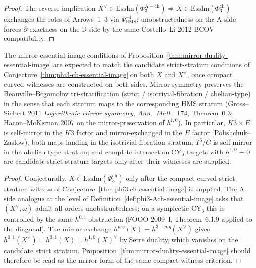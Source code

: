 \begin{proof}
The reverse implication $X^\vee \in \mathrm{EssIm}(\Phi_3^{\mathrm{A-ch}}) \Rightarrow X \in \mathrm{EssIm}(\Phi_3^{\mathrm{ch}})$ exchanges the roles of Arrows~1--3 via $\Psi_{\mathrm{HMS}}^{-1}$: unobstructedness on the A-side forces $\bar\partial$-exactness on the B-side by the same Costello--Li 2012 BCOV compatibility.
\end{proof}

\begin{corollary}
\label{cor:mirror-essential-image-strict}
The mirror essential-image conditions of Proposition~\ref{thm:mirror-duality-essential-image} are expected to match the candidate strict-stratum conditions of Conjecture~\ref{thm:phi3-ch-essential-image} on both $X$ and $X^\vee$, once compact curved witnesses are constructed on both sides. Mirror symmetry preserves the Beauville--Bogomolov tri-stratification (strict / isotrivial-fibration / abelian-type) in the sense that each stratum maps to the corresponding HMS stratum (Gross--Siebert 2011 \textit{Logarithmic mirror symmetry}, \textit{Ann.~Math.}~174, Theorem~0.3; Hacon--McKernan 2007 on the mirror-preservation of $h^{1,0}$). In particular, $K3 \times E$ is self-mirror in the $K3$ factor and mirror-exchanged in the $E$ factor (Polishchuk--Zaslow), both maps landing in the isotrivial-fibration stratum; $T^6/G$ is self-mirror in the abelian-type stratum; and complete-intersection CY$_3$ targets with $h^{1,0} = 0$ are candidate strict-stratum targets only after their witnesses are supplied.
\end{corollary}

\begin{proof}
Conjecturally, $X \in \mathrm{EssIm}(\Phi_3^{\mathrm{ch}})$ only after the compact curved strict-stratum witness of Conjecture~\ref{thm:phi3-ch-essential-image} is supplied. The A-side analogue at the level of Definition~\ref{def:phi3-Ach-essential-image} asks that $(X^\vee, \omega)$ admit all-orders unobstructedness; on a symplectic CY$_3$ this is controlled by the same $h^{0,1}$ obstruction (FOOO 2009~I, Theorem~6.1.9 applied to the diagonal). The mirror exchange $h^{p,q}(X) = h^{3-p,q}(X^\vee)$ gives $h^{0,1}(X^\vee) = h^{3,1}(X) = h^{1,0}(X)^\vee$ by Serre duality, which vanishes on the candidate strict stratum. Proposition~\ref{thm:mirror-duality-essential-image} should therefore be read as the mirror form of the same compact-witness criterion.
\end{proof}

